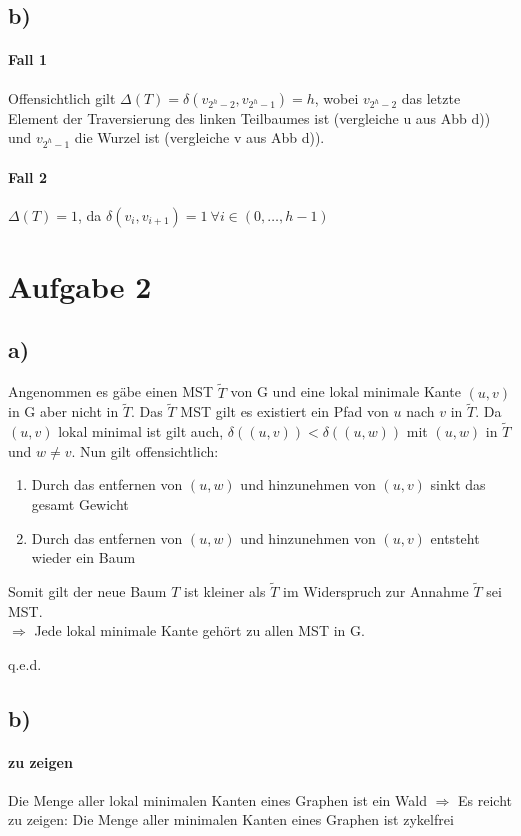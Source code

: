 \documentclass[a4paper,11pt,twoside]{scrartcl}
\newcommand{\qed}{%
	\begin{flushright}
		q.e.d.
	\end{flushright}%
	}
\begin{document}
\subsection{b)}
\paragraph{Fall 1}
Offensichtlich gilt $\Delta(T)=\delta(v_{2^h-2},v_{2^h-1}) = h$, wobei $v_{2^h-2}$ das letzte Element der Traversierung des linken Teilbaumes ist (vergleiche u aus Abb d)) und $v_{2^h-1}$ die Wurzel ist (vergleiche v aus Abb d)).
\paragraph{Fall 2}
$\Delta(T)=1$, da $\delta(v_i,v_{i+1}) = 1 ~\forall i \in ( 0,\ldots,h-1 )$
\section{Aufgabe 2}
\subsection{a)}
Angenommen es gäbe einen MST $\tilde{T}$ von G und eine lokal minimale Kante $(u,v)$ in G aber nicht in $\tilde{T}$. Das $\tilde{T}$ MST gilt es existiert ein Pfad von $u$ nach $v$ in $\tilde{T}$. Da $(u,v)$ lokal minimal ist gilt auch, $\delta((u,v)) < \delta((u,w))$ mit $(u,w)$ in $\tilde{T}$ und $w\neq v$. Nun gilt offensichtlich:
\begin{enumerate}
	\item Durch das entfernen von $(u,w)$ und hinzunehmen von $(u,v)$ sinkt das gesamt Gewicht
	\item Durch das entfernen von $(u,w)$ und hinzunehmen von $(u,v)$ entsteht wieder ein Baum
\end{enumerate}
Somit gilt der neue Baum $T$ ist kleiner als $\tilde{T}$ im Widerspruch zur Annahme $\tilde{T}$ sei MST.\\
$\Rightarrow$ Jede lokal minimale Kante gehört zu allen MST in G.\qed
\subsection{b)}
\paragraph{zu zeigen}
Die Menge aller lokal minimalen Kanten eines Graphen ist ein Wald $\Rightarrow$ Es reicht zu zeigen: Die Menge aller minimalen Kanten eines Graphen ist zykelfrei
\end{document}
